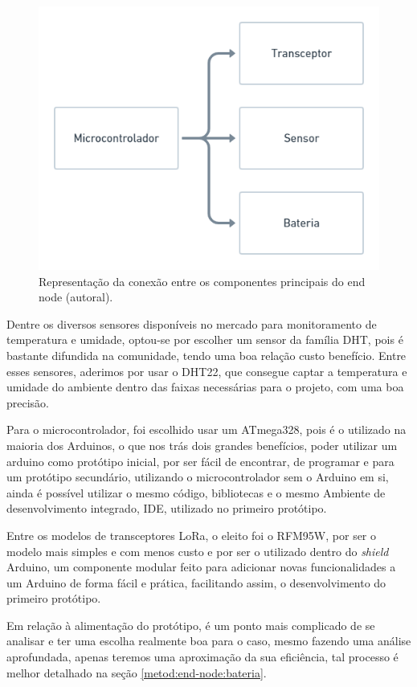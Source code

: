 \begin{figure}[H]
  \centering
  \includegraphics[width=.80\textwidth]{assets/end-node-schematic.png} 
  \caption{Representação da conexão entre os componentes principais do end node (autoral).}
  \label{fig:end-node-schematic} 
\end{figure}

Dentre os diversos sensores disponíveis no mercado para monitoramento de temperatura e umidade, optou-se por escolher um sensor da família DHT, pois é bastante difundida na comunidade, tendo uma boa relação custo benefício. Entre esses sensores, aderimos por usar o DHT22, que consegue captar a temperatura e umidade do ambiente dentro das faixas necessárias para o projeto, com uma boa precisão.

Para o microcontrolador, foi escolhido usar um ATmega328, pois é o utilizado na maioria dos Arduinos, o que nos trás dois grandes benefícios, poder utilizar um arduino como protótipo inicial, por ser fácil de encontrar, de programar e para um protótipo secundário, utilizando o microcontrolador sem o Arduino em si, ainda é possível utilizar o mesmo código, bibliotecas e o mesmo Ambiente de desenvolvimento integrado, IDE, utilizado no primeiro protótipo.

Entre os modelos de transceptores LoRa, o eleito foi o RFM95W, por ser o modelo mais simples e com menos custo e por ser o utilizado dentro do \textit{shield} Arduino, um componente modular feito para adicionar novas funcionalidades a um Arduino de forma fácil e prática, facilitando assim, o desenvolvimento do primeiro protótipo.

Em relação à alimentação do protótipo, é um ponto mais complicado de se analisar e ter uma escolha realmente boa para o caso, mesmo fazendo uma análise aprofundada, apenas teremos uma aproximação da sua eficiência, tal processo é melhor detalhado na seção \ref{metod:end-node:bateria}.

